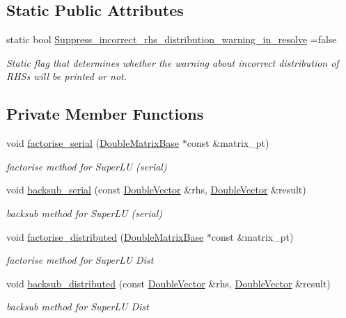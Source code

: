\subsection*{Static Public Attributes}
\begin{DoxyCompactItemize}
\item 
static bool \hyperlink{classoomph_1_1SuperLUSolver_a11c89f3138e42a38eb0cd5def128eabf}{Suppress\+\_\+incorrect\+\_\+rhs\+\_\+distribution\+\_\+warning\+\_\+in\+\_\+resolve} =false
\begin{DoxyCompactList}\small\item\em Static flag that determines whether the warning about incorrect distribution of R\+H\+Ss will be printed or not. \end{DoxyCompactList}\end{DoxyCompactItemize}
\subsection*{Private Member Functions}
\begin{DoxyCompactItemize}
\item 
void \hyperlink{classoomph_1_1SuperLUSolver_a6b1ce356d11fa878315e9b32ac566748}{factorise\+\_\+serial} (\hyperlink{classoomph_1_1DoubleMatrixBase}{Double\+Matrix\+Base} $\ast$const \&matrix\+\_\+pt)
\begin{DoxyCompactList}\small\item\em factorise method for Super\+LU (serial) \end{DoxyCompactList}\item 
void \hyperlink{classoomph_1_1SuperLUSolver_a3cf319015c149958fd68cfb631e6b2e9}{backsub\+\_\+serial} (const \hyperlink{classoomph_1_1DoubleVector}{Double\+Vector} \&rhs, \hyperlink{classoomph_1_1DoubleVector}{Double\+Vector} \&result)
\begin{DoxyCompactList}\small\item\em backsub method for Super\+LU (serial) \end{DoxyCompactList}\item 
void \hyperlink{classoomph_1_1SuperLUSolver_ab60386fae7cd417ad62f46c3cb1463c0}{factorise\+\_\+distributed} (\hyperlink{classoomph_1_1DoubleMatrixBase}{Double\+Matrix\+Base} $\ast$const \&matrix\+\_\+pt)
\begin{DoxyCompactList}\small\item\em factorise method for Super\+LU Dist \end{DoxyCompactList}\item 
void \hyperlink{classoomph_1_1SuperLUSolver_a6f57fd508b25b730841de735bbea2b17}{backsub\+\_\+distributed} (const \hyperlink{classoomph_1_1DoubleVector}{Double\+Vector} \&rhs, \hyperlink{classoomph_1_1DoubleVector}{Double\+Vector} \&result)
\begin{DoxyCompactList}\small\item\em backsub method for Super\+LU Dist \end{DoxyCompactList}\end{DoxyCompactItemize}
